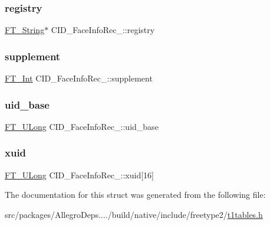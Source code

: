 \subsubsection{\texorpdfstring{registry}{registry}}
{\footnotesize\ttfamily \hyperlink{fttypes_8h_a9846214585359eb2ba6bbb0e6de30639}{F\+T\+\_\+\+String}$\ast$ C\+I\+D\+\_\+\+Face\+Info\+Rec\+\_\+\+::registry}

\mbox{\label{struct_c_i_d___face_info_rec___a6d35a867d12ca9cfa6ab06cf329d0354}} 
\subsubsection{\texorpdfstring{supplement}{supplement}}
{\footnotesize\ttfamily \hyperlink{fttypes_8h_af90e5fb0d07e21be9fe6faa33f02484c}{F\+T\+\_\+\+Int} C\+I\+D\+\_\+\+Face\+Info\+Rec\+\_\+\+::supplement}

\mbox{\label{struct_c_i_d___face_info_rec___a1fae2d9b863a9e27089894789ab4413e}} 
\subsubsection{\texorpdfstring{uid\+\_\+base}{uid\_base}}
{\footnotesize\ttfamily \hyperlink{fttypes_8h_a4fac88bdba78eb76b505efa6e4fbf3f5}{F\+T\+\_\+\+U\+Long} C\+I\+D\+\_\+\+Face\+Info\+Rec\+\_\+\+::uid\+\_\+base}

\mbox{\label{struct_c_i_d___face_info_rec___a32cd8836dd8a395d9aa6fb5831f06b27}} 
\subsubsection{\texorpdfstring{xuid}{xuid}}
{\footnotesize\ttfamily \hyperlink{fttypes_8h_a4fac88bdba78eb76b505efa6e4fbf3f5}{F\+T\+\_\+\+U\+Long} C\+I\+D\+\_\+\+Face\+Info\+Rec\+\_\+\+::xuid\mbox{[}16\mbox{]}}



The documentation for this struct was generated from the following file\+:\begin{DoxyCompactItemize}
\item 
src/packages/\+Allegro\+Deps..../build/native/include/freetype2/\hyperlink{t1tables_8h}{t1tables.\+h}\end{DoxyCompactItemize}
